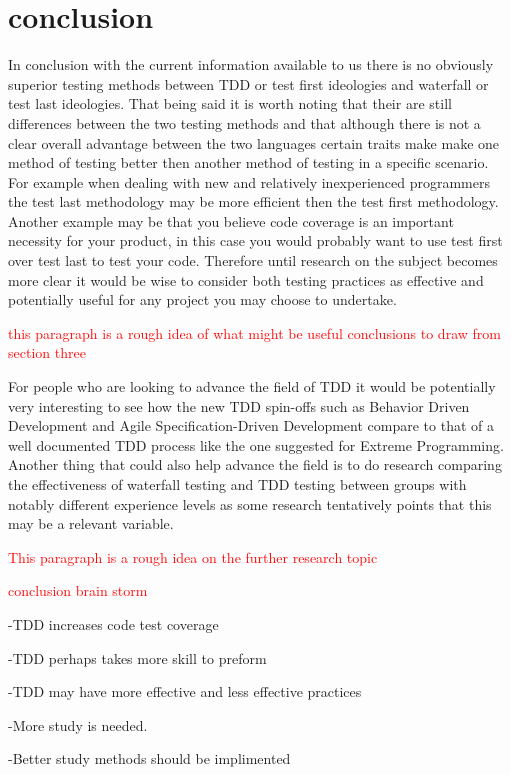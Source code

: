 \documentclass{sig-alternate}
\newcommand{\mycomment}[1]{\textcolor{red}{#1}}
\begin{document}
\section{conclusion}
In conclusion with the current information available to us there is no obviously superior testing methods between TDD or test first ideologies and waterfall or test last ideologies.  That being said it is worth noting that their are still differences between the two testing methods and that although there is not a clear overall advantage between the two languages certain traits make make one method of testing better then another method of testing in a specific scenario.  For example when dealing with new and relatively inexperienced programmers the test last methodology may be more efficient then the test first methodology.  Another example may be that you believe code coverage is an important necessity for your product, in this case you would probably want to use test first over test last to test your code.  Therefore until research on the subject becomes more clear it would be wise to consider both testing practices as effective and potentially useful for any project you may choose to undertake.

\mycomment{this paragraph is a rough idea of what might be useful conclusions to draw from section three}

For people who are looking to advance the field of TDD it would be potentially very interesting to see how the new TDD spin-offs such as Behavior Driven Development and Agile Specification-Driven Development compare to that of a well documented TDD process like the one suggested for Extreme Programming.  Another thing that could also help advance the field is to do research comparing the effectiveness of waterfall testing and TDD testing between groups with notably different experience levels as some research tentatively points that this may be a relevant variable.

\mycomment{This paragraph is a rough idea on the further research topic}

\mycomment{conclusion brain storm}

-TDD increases code test coverage

-TDD perhaps takes more skill to preform

-TDD may have more effective and less effective practices

-More study is needed.

-Better study methods should be implimented


  
\end{document}
